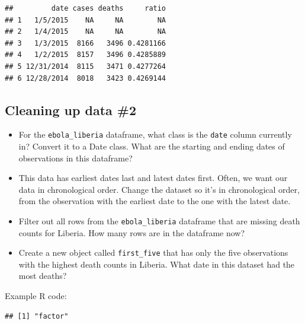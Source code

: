 \documentclass[]{book}
\makeatletter
\newenvironment{Shaded}{\begin{snugshade}}{\end{snugshade}}
\newcommand{\KeywordTok}[1]{\textcolor[rgb]{0.13,0.29,0.53}{\textbf{#1}}}
\newcommand{\DataTypeTok}[1]{\textcolor[rgb]{0.13,0.29,0.53}{#1}}
\newcommand{\StringTok}[1]{\textcolor[rgb]{0.31,0.60,0.02}{#1}}
\newcommand{\OperatorTok}[1]{\textcolor[rgb]{0.81,0.36,0.00}{\textbf{#1}}}
\newcommand{\NormalTok}[1]{#1}
\providecommand{\tightlist}{%
  \setlength{\itemsep}{0pt}\setlength{\parskip}{0pt}}
\newenvironment{kframe}{%
\medskip{}
\setlength{\fboxsep}{.8em}
 \def\at@end@of@kframe{}%
 \ifinner\ifhmode%
  \def\at@end@of@kframe{\end{minipage}}%
  \begin{minipage}{\columnwidth}%
 \fi\fi%
 \def\FrameCommand##1{\hskip\@totalleftmargin \hskip-\fboxsep
 \colorbox{shadecolor}{##1}\hskip-\fboxsep
     \hskip-\linewidth \hskip-\@totalleftmargin \hskip\columnwidth}%
 \MakeFramed {\advance\hsize-\width
   \@totalleftmargin\z@ \linewidth\hsize
   \@setminipage}}%
 {\par\unskip\endMakeFramed%
 \at@end@of@kframe}
\renewenvironment{Shaded}{\begin{kframe}}{\end{kframe}}
\theoremstyle{definition}
\theoremstyle{definition}
\theoremstyle{definition}
\theoremstyle{remark}
\makeatother
\begin{document}
\begin{verbatim}
##         date cases deaths     ratio
## 1   1/5/2015    NA     NA        NA
## 2   1/4/2015    NA     NA        NA
## 3   1/3/2015  8166   3496 0.4281166
## 4   1/2/2015  8157   3496 0.4285889
## 5 12/31/2014  8115   3471 0.4277264
## 6 12/28/2014  8018   3423 0.4269144
\end{verbatim}

\subsection{Cleaning up data \#2}\label{cleaning-up-data-2}

\begin{itemize}
\tightlist
\item
  For the \texttt{ebola\_liberia} dataframe, what class is the
  \texttt{date} column currently in? Convert it to a Date class. What
  are the starting and ending dates of observations in this dataframe?
\item
  This data has earliest dates last and latest dates first. Often, we
  want our data in chronological order. Change the dataset so it's in
  chronological order, from the observation with the earliest date to
  the one with the latest date.
\item
  Filter out all rows from the \texttt{ebola\_liberia} dataframe that
  are missing death counts for Liberia. How many rows are in the
  dataframe now?
\item
  Create a new object called \texttt{first\_five} that has only the five
  observations with the highest death counts in Liberia. What date in
  this dataset had the most deaths?
\end{itemize}

Example R code:

\begin{Shaded}
\end{Shaded}

\begin{verbatim}
## [1] "factor"
\end{verbatim}

\begin{Shaded}
\end{Shaded}
\end{document}
